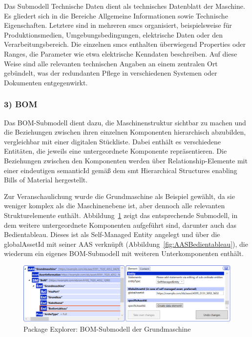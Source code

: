 Das Submodell Technische Daten dient als technisches Datenblatt der Maschine.  
Es gliedert sich in die Bereiche Allgemeine Informationen sowie Technische Eigenschaften. 
Letztere sind in mehreren \acsp{smc} organisiert, beispielsweise für Produktionsmedien, Umgebungsbedingungen, elektrische Daten oder den Verarbeitungsbereich. 
Die einzelnen \acsp{smc} enthalten überwiegend Properties oder Ranges, die Parameter wie etwa elektrische Kenndaten beschreiben. 
Auf diese Weise sind alle relevanten technischen Angaben an einem zentralen Ort gebündelt, was der redundanten Pflege in verschiedenen Systemen oder Dokumenten entgegenwirkt. 

\subsubsection*{3) BOM}
\vspace{-0.5em}

Das BOM-Submodell dient dazu, die Maschinenstruktur sichtbar zu machen und die Beziehungen zwischen ihren einzelnen Komponenten hierarchisch abzubilden, vergleichbar mit einer digitalen Stückliste.
Dabei enthält es verschiedene Entitäten, die jeweils eine untergeordnete Komponente repräsentieren.
Die Beziehungen zwischen den Komponenten werden über Relationship-Elemente mit einer eindeutigen semanticId gemäß dem \acs{smt} Hierarchical Structures enabling Bills of Material \cite{SpezifikationHierachischeStrukturen} hergestellt.

Zur Veranschaulichung wurde die Grundmaschine als Beispiel gewählt, da sie weniger komplex als die Maschinenebene ist, aber dennoch alle relevanten Strukturelemente enthält.
Abbildung~\ref{fig:BOMSubmodelGrundmashcine} zeigt das entsprechende Submodell, in dem weitere untergeordnete Komponenten aufgeführt sind, darunter auch das Bedientableau.
Dieses ist als Self-Managed Entity angelegt und über die globalAssetId mit seiner AAS verknüpft (Abbildung~\ref{fig:AASBedientableau}), die wiederum ein eigenes BOM-Submodell mit weiteren Unterkomponenten enthält.

\begin{figure}[htbp]
    \centering
        \includegraphics[width=1\textwidth]{Bilder/ErgebnissePackageExplorer/AASGrundmaschine.PNG}
    \caption{Package Explorer: BOM-Submodell der Grundmaschine}
    \label{fig:BOMSubmodelGrundmashcine}
\end{figure}

